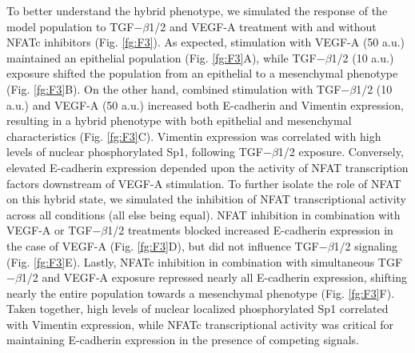 \documentclass[12pt]{article}
\begin{document}

To better understand the hybrid phenotype, we simulated the response of the model population to TGF$-\beta$1/2 and VEGF-A treatment with and without NFATc inhibitors (Fig. \ref{fg:F3}).
As expected, stimulation with VEGF-A (50 a.u.) maintained an epithelial population (Fig. \ref{fg:F3}A), while TGF$-\beta$1/2 (10 a.u.) exposure shifted
the population from an epithelial to a mesenchymal phenotype (Fig. \ref{fg:F3}B).
On the other hand, combined stimulation with TGF$-\beta$1/2 (10 a.u.) and VEGF-A (50 a.u.) increased both E-cadherin and Vimentin expression, resulting in a hybrid phenotype with both epithelial and mesenchymal characteristics (Fig. \ref{fg:F3}C).
Vimentin expression was correlated with high levels of nuclear phosphorylated Sp1, following TGF$-\beta$1/2 exposure.
Conversely, elevated E-cadherin expression depended upon the activity of NFAT transcription factors downstream of VEGF-A stimulation.
To further isolate the role of NFAT on this hybrid state, we simulated the inhibition of NFAT transcriptional activity across all conditions (all else being equal).
NFAT inhibition in combination with VEGF-A or TGF$-\beta$1/2 treatments blocked increased E-cadherin expression in the case of VEGF-A (Fig. \ref{fg:F3}D), but did not influence TGF$-\beta$1/2 signaling (Fig. \ref{fg:F3}E).
Lastly, NFATc inhibition in combination with simultaneous TGF$-\beta$1/2 and VEGF-A exposure repressed nearly all E-cadherin expression, shifting nearly the entire population towards a mesenchymal phenotype (Fig. \ref{fg:F3}F). Taken together, high levels of nuclear localized phosphorylated Sp1 correlated with Vimentin expression,
while NFATc transcriptional activity was critical for maintaining E-cadherin expression in the presence of competing signals.

\end{document}
